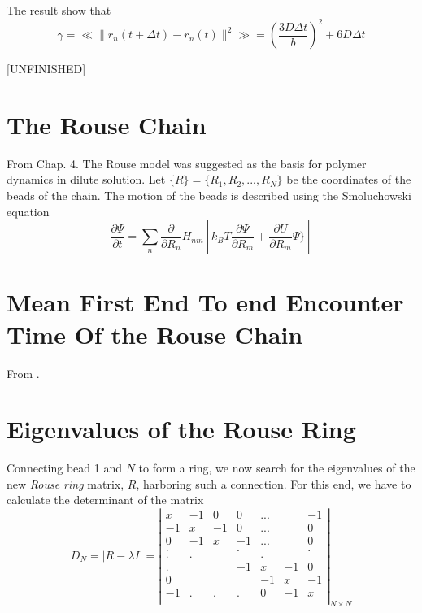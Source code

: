 \documentclass{paper}
\begin{document}
The result show that 
\begin{equation*}
\gamma=\ll\|r_n(t+\Delta t)-r_n(t) \|^2\gg = \left(\frac{3D\Delta t}{b} \right)^2+6D\Delta t
\end{equation*}

[UNFINISHED] 
\section{The Rouse Chain}\label{section_theRouseChain}
From \cite{doi1986theory} Chap. 4. The Rouse model was suggested as the basis for polymer dynamics in dilute solution. Let $\{R\}=\{R_1,R_2,...,R_N\}$ be the coordinates of the beads of the chain. The motion of the beads is described using the Smoluchowski equation
\begin{equation*}
\frac{\partial \Psi}{\partial t }=\sum_n \frac{\partial}{\partial R_n}H_{nm}\left[k_BT\frac{\partial \Psi}{\partial R_m}+\frac{\partial U}{\partial R_m}\Psi\}\right]
\end{equation*}


\section{Mean First End To end Encounter Time Of the Rouse Chain}\label{sectioni_meanEndToEndEncounterTimeOfTheRouseChain}
From \cite{amitai2012computation}. 

\section{Eigenvalues of the Rouse Ring}\label{section_eigenvaluesOfTheRouseRing}
Connecting bead 1 and $N$ to form a ring, we now search for the eigenvalues of the new \textit{Rouse ring} matrix, $R$, harboring such a connection. For this end, we have to calculate the determinant of the matrix
\begin{equation*}
D_N=|R-\lambda I|=\left|
\begin{matrix}
 x  & -1 &  0 &  0 &...&   & -1 \\
-1  &  x & -1 &  0 &...&   &  0 \\
 0  & -1 &  x & -1 &...&   &  0 \\
 .  &    &    &  . &   &   &  . \\
  . &   .&    &    &  .&   & \\
 .  &    &    & -1 & x &-1 & 0 \\
 0  &    &    &    & -1& x & -1 \\
 -1 &   .&  . & .  &  0&-1 &  x \\     
\end{matrix}
\right|_{N\times N}
\end{equation*}
\end{document}
